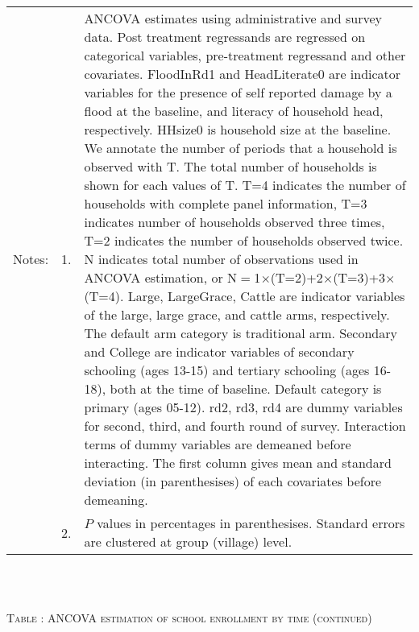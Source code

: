 \begin{minipage}[t]{14cm}
\begin{tabular}{>{\hfill\scriptsize}p{1cm}<{}>{\hfill\scriptsize}p{.25cm}<{}>{\scriptsize}p{12cm}<{\hfill}}
Notes: & 1. & ANCOVA estimates using administrative and survey data. Post treatment regressands are regressed on categorical variables, pre-treatment regressand and other covariates. \textsf{FloodInRd1} and \textsf{HeadLiterate0} are indicator variables for the presence of self reported damage by a flood at the baseline, and literacy of household head, respectively. \textsf{HHsize0} is household size at the baseline. We annotate the number of periods that a household is observed with \textsf{T}. The total number of households is shown for each values of \textsf{T}. \textsf{T=4} indicates the number of households with complete panel information, \textsf{T=3} indicates number of households observed three times, \textsf{T=2} indicates the number of households observed twice. \textsf{N} indicates total number of observations used in ANCOVA estimation, or \textsf{N$=$1$\times$(T=2)+2$\times$(T=3)+3$\times$(T=4)}.  \textsf{Large}, \textsf{LargeGrace}, \textsf{Cattle} are indicator variables of the \textsf{large}, \textsf{large grace}, and \textsf{cattle} arms, respectively. The default arm category is \textsf{traditional} arm. \textsf{Secondary} and \textsf{College} are indicator variables of secondary schooling (ages 13-15) and tertiary schooling (ages 16-18), both at the time of baseline. Default category is primary (ages 05-12). \textsf{rd2, rd3, rd4} are dummy variables for second, third, and fourth round of survey. Interaction terms of dummy variables are demeaned before interacting. The first column gives mean and standard deviation (in parenthesises) of each covariates before demeaning. \\
& 2. & $P$ values in percentages in parenthesises. Standard errors are clustered at group (village) level. %
 \end{tabular}
\end{minipage} \\\\\addtocounter{table}{-1}\hspace{-1cm}\begin{minipage}[t]{14cm} \hfil\textsc{\normalsize Table \thetable: ANCOVA estimation of school enrollment by time (continued)\label{tab ANCOVA enroll time varying2}}\\ \setlength{\tabcolsep}{1pt}
  \setlength{\baselineskip}{8pt}
  \renewcommand{\arraystretch}{.55}
  \hfil\begin{tikzpicture}

\end{tikzpicture}
\end{minipage}
